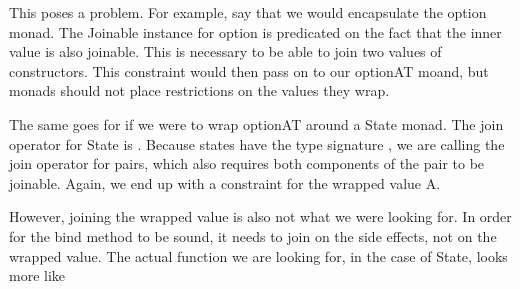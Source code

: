 This poses a problem. For example, say that we would encapsulate the option
monad. The Joinable instance for option is predicated on the fact that the inner
value  is also joinable. This is necessary to be able to join two values of
 constructors. This constraint would then pass on to our optionAT
moand, but monads should not place restrictions on the values they wrap.

The same goes for if we were to wrap optionAT around a State monad. The join
operator for State is 
.
Because states have the type signature , we are calling the
join operator for pairs, which also requires both components of the pair to be
joinable. Again, we end up with a constraint for the wrapped value A.

However, joining the wrapped value is also not what we were looking for. In
order for the bind method to be sound, it needs to join on the side effects,
not on the wrapped value. The actual function we are looking for, in the case
of State, looks more like 
